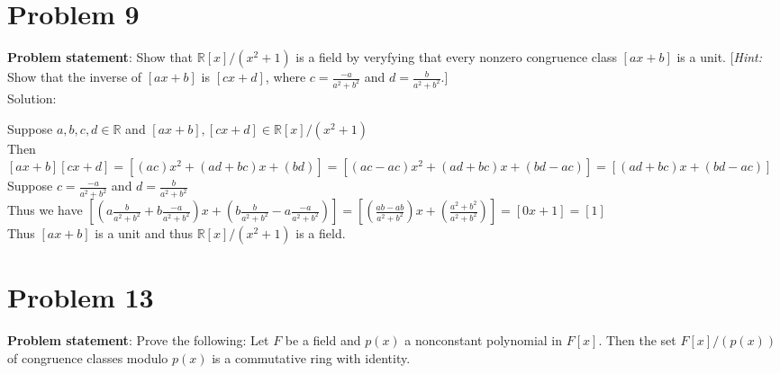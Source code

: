 \documentclass{article} %
\begin{document}
\newpage

\section*{Problem 9}


\textbf{Problem statement}: Show that $\mathbb{R}[x]/(x^2+1)$ is a field by veryfying that every nonzero congruence class $[ax + b]$ is a unit.  [\textit{Hint: } Show that the inverse of $[ax + b]$ is $[cx + d]$, where $c = \frac{-a}{a^2 + b^2}$ and $d = \frac{b}{a^2 + b^2}$.]
\\

Solution: 
\begin{addmargin}[1em]{0em}
Suppose $a,b,c,d \in \mathbb{R}$ and $[ax + b], [cx + d] \in \mathbb{R}[x]/(x^2+1)$
\\Then $[ax + b][cx + d] = [(ac)x^2 + (ad + bc)x + (bd)] = [(ac - ac)x^2 + (ad + bc)x + (bd - ac)] = [(ad + bc)x + (bd - ac)]$
\\Suppose $c = \frac{-a}{a^2 + b^2}$ and $d = \frac{b}{a^2 + b^2}$
\\Thus we have $[(a\frac{b}{a^2 + b^2} + b\frac{-a}{a^2 + b^2})x + (b\frac{b}{a^2 + b^2} - a\frac{-a}{a^2 + b^2})] = [(\frac{ab - ab}{a^2 + b^2})x + (\frac{a^2 + b^2}{a^2 + b^2})] = [0x + 1] = [1]$
\\Thus $[ax + b]$ is a unit and thus $\mathbb{R}[x]/(x^2 + 1)$ is a field.
\end{addmargin}

\newpage

\section*{Problem 13}


\textbf{Problem statement}: Prove the following: Let $F$  be a field and $p(x)$ a nonconstant polynomial in $F[x]$.  Then the set $F[x]/(p(x))$ of congruence classes modulo $p(x)$ is a commutative ring with identity.
\\
\end{document}
